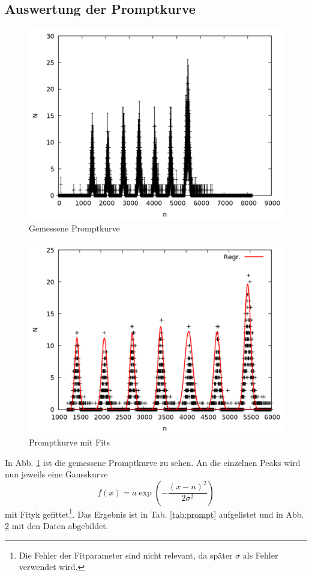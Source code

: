 \subsection{Auswertung der Promptkurve}

\begin{figure}
\centering
\includegraphics[width=0.7\linewidth]{data/prompt.png}
\caption{Gemessene Promptkurve}
\label{fig:prompt}
\end{figure}

\begin{figure}
\centering
\includegraphics[width=0.7\linewidth]{data/prompt2.png}
\caption{Promptkurve mit Fits}
\label{fig:prompt2}
\end{figure}

In Abb. \ref{fig:prompt} ist die gemessene Promptkurve zu sehen. An die einzelnen Peaks wird nun jeweils eine Gausskurve \[f(x) = a\exp{\left(-\frac{(x-n)^2}{2\sigma^2}\right)}\]mit Fityk gefittet\footnote{Die Fehler der Fitparameter sind nicht relevant, da später $\sigma$ als Fehler verwendet wird.}. Das Ergebnis ist in Tab. \ref{tab:prompt} aufgelistet und in Abb. \ref{fig:prompt2} mit den Daten abgebildet.


